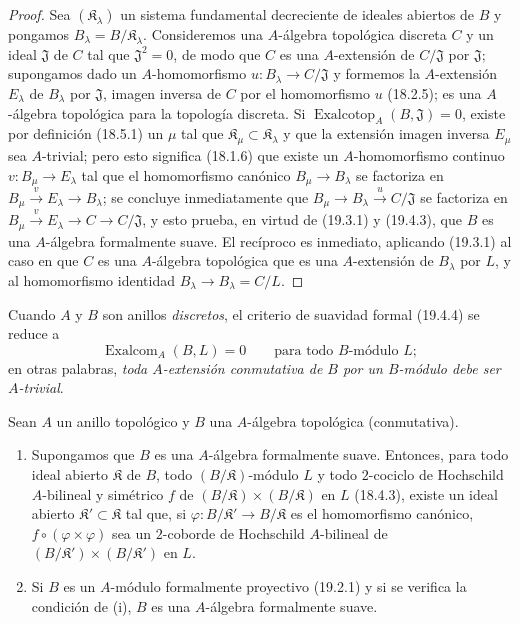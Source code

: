 \begin{proof}
Sea $(\mathfrak K_\lambda)$ un sistema fundamental decreciente de ideales
abiertos de $B$ y pongamos $B_\lambda=B/\mathfrak K_\lambda$.
Consideremos una $A$-álgebra topológica discreta $C$ y un ideal
$\mathfrak J$ de $C$ tal que $\mathfrak J^2=0$, de modo que $C$ es una
$A$-extensión de $C/\mathfrak J$ por $\mathfrak J$; supongamos dado un
$A$-homomorfismo $u:B_\lambda\to C/\mathfrak J$ y formemos la
$A$-extensión $E_\lambda$ de $B_\lambda$ por $\mathfrak J$, imagen
inversa de $C$ por el homomorfismo $u$ (18.2.5); es una $A$-álgebra
topológica para la topología discreta. Si
$\operatorname{Exalcotop}_A(B,\mathfrak J)=0$, existe por definición (18.5.1) un
$\mu$ tal que $\mathfrak K_\mu\subset\mathfrak K_\lambda$ y que
la extensión imagen inversa $E_\mu$ sea $A$-trivial; pero esto significa
(18.1.6) que existe un $A$-homomorfismo continuo
$v:B_\mu\to E_\lambda$ tal que el homomorfismo canónico
$B_\mu\to B_\lambda$ se factoriza en
$B_\mu\xrightarrow{v}E_\lambda\to B_\lambda$; se concluye
inmediatamente que $B_\mu\to B_\lambda\xrightarrow{u}C/\mathfrak J$ se
factoriza en
$B_\mu\xrightarrow{v}E_\lambda\to C\to C/\mathfrak J$, y esto
prueba, en virtud de (19.3.1) y (19.4.3), que $B$ es una $A$-álgebra
formalmente suave. El recíproco es inmediato, aplicando (19.3.1) al caso
en que $C$ es una $A$-álgebra topológica que es una $A$-extensión de
$B_\lambda$ por $L$, y al homomorfismo identidad
$B_\lambda\to B_\lambda=C/L$.
\end{proof}

Cuando $A$ y $B$ son anillos \emph{discretos}, el criterio de suavidad formal
(19.4.4) se reduce a
\begin{equation}
\tag{19.4.4.1}
\label{0.19.4.4.1-fr}
\operatorname{Exalcom}_A(B,L)=0\qquad\text{para todo $B$-módulo $L$};
\end{equation}
en otras palabras, \emph{toda $A$-extensión conmutativa de $B$ por un
$B$-módulo debe ser $A$-trivial}.

\begin{corollary}[19.4.5]
\label{0.19.4.5-fr}
Sean $A$ un anillo topológico y $B$ una $A$-álgebra topológica
(conmutativa).
\begin{enumerate}
  \item[\textup{(i)}] Supongamos que $B$ es una $A$-álgebra formalmente suave.
  Entonces, para todo ideal abierto $\mathfrak K$ de $B$, todo
  $(B/\mathfrak K)$-módulo $L$ y todo $2$-cociclo de Hochschild
  $A$-bilineal y simétrico $f$ de
  $(B/\mathfrak K)\times(B/\mathfrak K)$ en $L$ \textup{(18.4.3)}, existe un
  ideal abierto $\mathfrak K'\subset\mathfrak K$ tal que, si
  $\varphi:B/\mathfrak K'\to B/\mathfrak K$ es el homomorfismo
  canónico, $f\circ(\varphi\times\varphi)$ sea un $2$-coborde de
  Hochschild $A$-bilineal de
  $(B/\mathfrak K')\times(B/\mathfrak K')$ en $L$.
  \item[\textup{(ii)}] Si $B$ es un $A$-módulo formalmente proyectivo \textup{(19.2.1)} y si
  se verifica la condición de \textup{(i)}, $B$ es una $A$-álgebra formalmente
  suave.
\end{enumerate}
\end{corollary}

